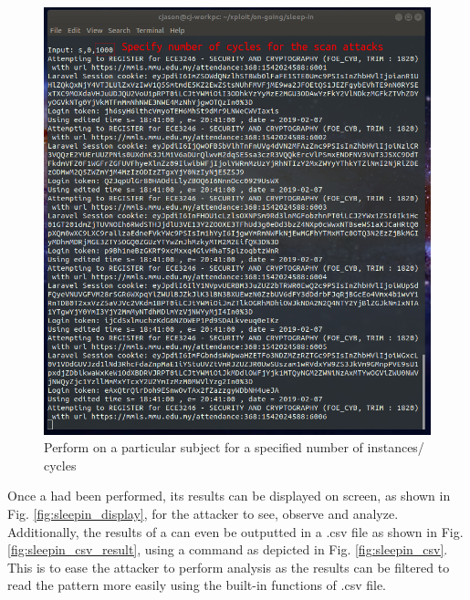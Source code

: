\documentclass[runningheads]{llncs}
\begin{document}
\begin{figure}
\includegraphics[width=\textwidth]{imgres/sleepin_scanx.png}
\caption{Perform \scanattack{} on a particular subject for a specified number of instances/ cycles} 
\label{fig:sleepin_scan_for_x}
\end{figure}

Once a \scanattack{} had been performed, its results can be displayed on screen, as shown in Fig. \ref{fig:sleepin_display}, for the attacker to see, observe and analyze. Additionally, the results of a \scanattack{} can even be outputted in a .csv file as shown in Fig. \ref{fig:sleepin_csv_result}, using a command as depicted in Fig. \ref{fig:sleepin_csv}. This is to ease the attacker to perform analysis as the results can be filtered to read the pattern more easily using the built-in functions of .csv file.  
\end{document}
